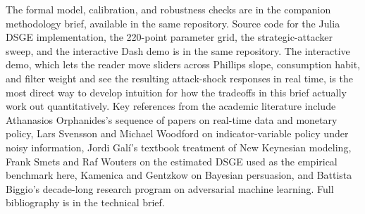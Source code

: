 \documentclass[12pt]{article}
\begin{document}
The formal model, calibration, and robustness checks are in the companion methodology brief, available in the same repository. Source code for the Julia DSGE implementation, the 220-point parameter grid, the strategic-attacker sweep, and the interactive Dash demo is in the same repository. The interactive demo, which lets the reader move sliders across Phillips slope, consumption habit, and filter weight and see the resulting attack-shock responses in real time, is the most direct way to develop intuition for how the tradeoffs in this brief actually work out quantitatively. Key references from the academic literature include Athanasios Orphanides's sequence of papers on real-time data and monetary policy, Lars Svensson and Michael Woodford on indicator-variable policy under noisy information, Jordi Galí's textbook treatment of New Keynesian modeling, Frank Smets and Raf Wouters on the estimated DSGE used as the empirical benchmark here, Kamenica and Gentzkow on Bayesian persuasion, and Battista Biggio's decade-long research program on adversarial machine learning. Full bibliography is in the technical brief.
\end{document}
